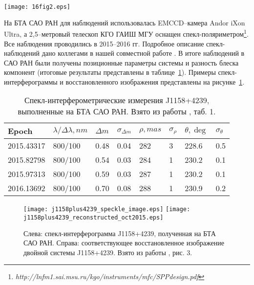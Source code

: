 \begin{figure*}
\centering
\texttt{[image: 16fig2.eps]}
\caption{Движение фотоцентра системы J1158+4239 по данным фотографических и цифровых обзоров неба (1955 "--- POSS1, 1984 "--- GSC1, 1990 и 1991 "--- POSS2, 1996 "--- GSC2, 2003 "--- SDSS, 2012 "--- пулковские наблюдения). Линия характеризует среднее движение фотоцентра.  Взято из работы \cite{2016AstL...42..686K}, рис. 2.}
\label{fig:J1158+4258_motion}
\end{figure*}
На БТА САО РАН для наблюдений использовалась  EMCCD--камера Andor iXon Ultra, а 2,5--метровый телескоп КГО ГАИШ МГУ оснащен спекл-поляриметром\footnote{\textit{http://lnfm1.sai.msu.ru/kgo/instruments/mfc/SPPdesign.pdf}}. Все наблюдения проводились в 2015--2016 гг.  Подробное описание спекл-наблюдений дано коллегами в нашей совместной работе \cite{2016AstL...42..686K}. В итоге наблюдений в САО РАН были получены позиционные параметры системы и разность блеска компонент (итоговые результаты представлены в таблице~\ref{tab:SI_meas}).  Примеры спекл-интерферограммы и восстановленного изображения представлены на рисунке~\ref{fig:sao_spekle_image}.

\begin{table}[p]
\centering
\caption{Спекл-интерферометрические измерения J1158+4239, выполненные на БТА САО РАН. Взято из работы \cite{2016AstL...42..686K}, таб. 1.}
\label{tab:SI_meas}
\bigskip
\begin{tabularx}{\textwidth}{l|l|ll|ll|ll}
Epoch      & $\lambda /\Delta \lambda, nm$ & $\Delta m$ & $\sigma _{\Delta m}$ & $\rho, mas$ & $\sigma _\rho$ & $\theta, \deg $& $\sigma_\theta$ \\
\hline
2015.43317 & 800/100 & 0.48 & 0.04 & 282 & 3  & 228.6 & 0.5               \\
2015.82798 & 800/100 & 0.54 & 0.03 & 284 & 1  & 230.2 & 0.1               \\
2015.97313 & 800/100 & 0.59 & 0.03 & 287 & 1  & 230.2 & 0.1               \\
2016.13692 & 800/100 & 0.70 & 0.08 & 288 & 1  & 230.9 & 0.2               \\
\hline
\end{tabularx}
\end{table}

\begin{figure}
\centering
\texttt{[image: j1158plus4239\_speckle\_image.eps]}
\texttt{[image: j1158plus4239\_reconstructed\_oct2015.eps]}
\caption{Слева: спекл-интерферограмма J1158+4239, полученная на БТА САО РАН. Справа: соответствующее восстановленное изображение двойной системы J1158+4239. Взято из работы \cite{2016AstL...42..686K}, рис. 3.}
\label{fig:sao_spekle_image}
\end{figure}

